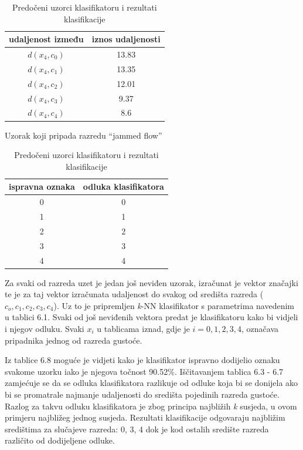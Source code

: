 \documentclass[times, utf8, zavrsni]{fer}
\begin{document}
\vspace{-1.5em}
\begin{table}[!ht]
\parbox{.45\linewidth}{
\centering
\begin{tabular}{c|c}
udaljenost između & iznos udaljenosti \\
\hline
\(d(x_4, c_0)\) & 13.83 \\
\(d(x_4, c_1)\) & 13.35 \\
\(d(x_4, c_2)\) & 12.01 \\
\(d(x_4, c_3)\) & 9.37 \\
\(d(x_4, c_4)\) & 8.6 \\
\end{tabular}
\caption{Uzorak koji pripada razredu \enquote{jammed flow}}
}
\hfill
\parbox{.45\linewidth}{
\centering
\begin{tabular}{c|c}
ispravna oznaka & odluka klasifikatora \\
\hline
0 & 0 \\
1 & 1 \\
2 & 2 \\
3 & 3 \\
4 & 4 \\
\end{tabular}
\caption{Predočeni uzorci klasifikatoru i rezultati klasifikacije}
}
\end{table}

Za svaki od razreda uzet je jedan još neviđen uzorak, izračunat je vektor značajki te je  za taj vektor
 izračunata udaljenost do svakog od središta razreda (\(c_o, c_1, c_2, c_3, c_4\)). Uz to je pripremljen 
\textit{k}-NN klasifikator s parametrima navedenim u tablici 6.1. Svaki od još neviđenih vektora
predat je klasifikatoru kako bi vidjeli i njegov odluku. Svaki \(x_i\) u tablicama iznad, gdje je \(i=0,1,2,3,4\),
označava pripadnika jednog od razreda gustoće.

\bigbreak

Iz tablice 6.8 moguće je vidjeti kako je klasifikator ispravno dodijelio oznaku svakome uzorku iako
je njegova točnost 90.52\%. Iščitavanjem tablica 6.3 - 6.7 zamjećuje se da se odluka klasifikatora
razlikuje od odluke koja bi se donijela ako bi se promatrale najmanje udaljenosti do središta pojedinih 
razreda gustoće. Razlog za takvu odluku klasifikatora je zbog principa najbližih \textit{k} 
susjeda, u ovom primjeru najbližeg jednog susjeda. Rezultati klasifikacije odgovaraju
najbližim središtima za slučajeve razreda: 0, 3, 4 dok je kod ostalih središte razreda različito od
dodijeljene odluke. 
\end{document}

